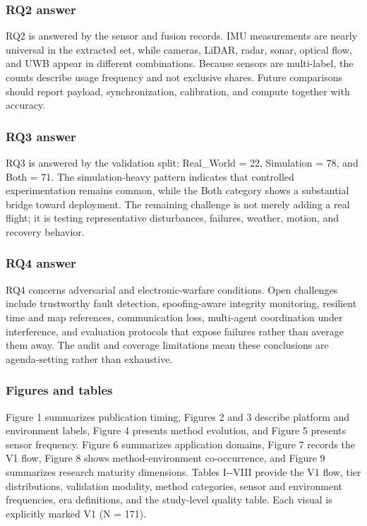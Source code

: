 \documentclass[
  journal,
  10pt]{IEEEtran}
\begin{document}
\subsubsection{RQ2 answer}\label{rq2-answer}

RQ2 is answered by the sensor and fusion records. IMU measurements are
nearly universal in the extracted set, while cameras, LiDAR, radar,
sonar, optical flow, and UWB appear in different combinations. Because
sensors are multi-label, the counts describe usage frequency and not
exclusive shares. Future comparisons should report payload,
synchronization, calibration, and compute together with accuracy.

\subsubsection{RQ3 answer}\label{rq3-answer}

RQ3 is answered by the validation split: Real\_World = 22, Simulation =
78, and Both = 71. The simulation-heavy pattern indicates that
controlled experimentation remains common, while the Both category shows
a substantial bridge toward deployment. The remaining challenge is not
merely adding a real flight; it is testing representative disturbances,
failures, weather, motion, and recovery behavior.

\subsubsection{RQ4 answer}\label{rq4-answer}

RQ4 concerns adversarial and electronic-warfare conditions. Open
challenges include trustworthy fault detection, spoofing-aware integrity
monitoring, resilient time and map references, communication loss,
multi-agent coordination under interference, and evaluation protocols
that expose failures rather than average them away. The audit and
coverage limitations mean these conclusions are agenda-setting rather
than exhaustive.

\subsubsection{Figures and tables}\label{figures-and-tables}

Figure 1 summarizes publication timing, Figures 2 and 3 describe
platform and environment labels, Figure 4 presents method evolution, and
Figure 5 presents sensor frequency. Figure 6 summarizes application
domains, Figure 7 records the V1 flow, Figure 8 shows method-environment
co-occurrence, and Figure 9 summarizes research maturity dimensions.
Tables I-\/-VIII provide the V1 flow, tier distributions, validation
modality, method categories, sensor and environment frequencies, era
definitions, and the study-level quality table. Each visual is
explicitly marked V1 (N = 171).
\end{document}
